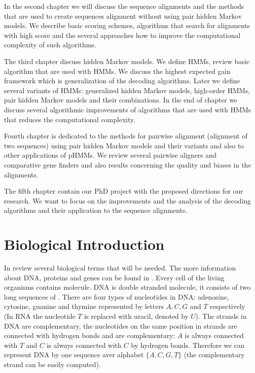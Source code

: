 In the second chapter we will discuss the sequence alignments and the methods
that are used to create sequences alignment without using pair hidden Markov
models. We describe basic scoring schemes, algorithms that search for alignments
with high score and the several approaches how to improve the computational
complexity of such algorithms.

The third chapter discuss hidden Markov models. We define HMMs, review basic
algorithm that are used with HMMs. We discuss the highest expected gain
framework which is generalization of the decoding algorithms. Later we define
several variants of HMMs: generalized hidden Markov models, high-order HMMs,
pair hidden Markov models and their combinations. In the end of chapter we
discuss several algorithmic improvements of algorithms that are used with HMMs
that reduces the computational complexity.

Fourth chapter is dedicated to the methods for pairwise alignment (alignment of
two sequences) using pair hidden Markov models and their variants and also to
other applications of pHMMs. We review several pairwise aligners and comparative
gene finders and also results concerning the quality and biases in the
alignments.

The fifth chapter contain our PhD project with the proposed directions for our
research. We want to focus on the improvements and the analysis of the decoding
algorithms and their application to the sequence alignments. 

\section{Biological Introduction}



In review several biological terms that will be needed. The more information
about DNA, proteins and genes can be found in
\cite{BiologyForDummies,UnderstandingBioinformatics}.
Every cell of the living organisms contains  molecule. DNA is
double stranded molecule, it consists of two long sequences of
. There are four types of nucleotides in DNA: adenosine,
cytosine, guanine and thymine represented by letters $A,C,G$ and $T$
respectively (In RNA the nucleotide $T$ is replaced with uracil, denoted by
$U$). The strands in DNA are complementary, the nucleotides on the same position
in strands are connected with hydrogen bonds and are complementary: $A$ is
always connected with $T$ and $C$ is always connected with $C$ by hydrogen
bonds. Therefore we can represent DNA by one sequence aver alphabet
$\{A,C,G,T\}$ (the complementary strand can be easily computed).

